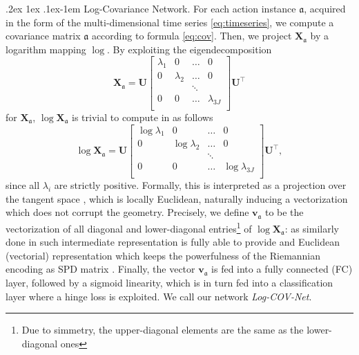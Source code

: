 \documentclass[10pt,twocolumn]{article}
\makeatletter
\renewcommand{\paragraph}{%
	\@startsection{paragraph}{4}%
	{\z@}{.2ex \@plus 1ex \@minus .1ex}{-1em}%
	{\normalfont\normalsize\bfseries}%
}
\makeatother
\begin{document}
\paragraph{Log-Covariance Network.} For each action instance $\mathfrak{a}$, acquired in the form of the multi-dimensional time series \eqref{eq:timeseries}, we compute a covariance matrix $\mathfrak{a}$ according to formula \eqref{eq:cov}. Then, we project $\mathbf{X}_\mathfrak{a}$ by a logarithm mapping $\log$. By exploiting the eigendecomposition
\begin{equation}
\mathbf{X}_\mathfrak{a} = \mathbf{U} \begin{bmatrix}
\lambda_1 & 0 & \dots & 0 \\
0 & \lambda_2 & \dots & 0 \\
& & \ddots & \\
0 & 0 & \dots & \lambda_{3J} \\
\end{bmatrix} \mathbf{U}^\top
\end{equation}
for $\mathbf{X}_\mathfrak{a}$, $\log \mathbf{X}_\mathfrak{a}$ is trivial to compute in as follows
\begin{equation}\label{eq:log}
\log \mathbf{X}_\mathfrak{a} = \mathbf{U} \begin{bmatrix}
\log \lambda_1 & 0 & \dots & 0 \\
0 & \log \lambda_2 & \dots & 0 \\
& & \ddots & \\
0 & 0 & \dots & \log \lambda_{3J} \\
\end{bmatrix} \mathbf{U}^\top,
\end{equation}
since all $\lambda_i$ are strictly positive. Formally, this is interpreted as a projection over the tangent space \cite{Har1,Har2,Harandi:CVPR14}, which is locally Euclidean, naturally inducing a vectorization which does not corrupt the geometry. Precisely, we define $\mathbf{v}_\mathfrak{a}$ to be the vectorization of all diagonal and lower-diagonal entries\footnote{Due to simmetry, the upper-diagonal elements are the same as the lower-diagonal ones} of $\log \mathbf{X}_\mathfrak{a}$: as similarly done in \cite{egizi,Wang:ICCV15,Cavazza:ICPR16} such intermediate representation is fully able to provide and Euclidean (vectorial) representation which keeps the powerfulness of the Riemannian encoding as SPD matrix \cite{Har1,Harandi:CVPR14,Har2}.  
Finally, the vector $\mathbf{v}_\mathfrak{a}$ is fed into a fully connected (FC) layer, followed by a sigmoid linearity, which is in turn fed into a classification layer where a hinge loss is exploited. We call our network \textit{\textit{Log-COV-Net}}.
\end{document}
